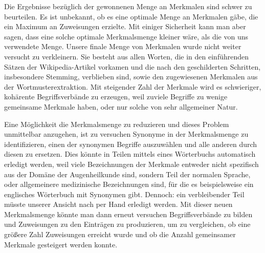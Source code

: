 \documentclass[pagesize,DIV=calc,12pt,final]{scrreprt}
\begin{document}
Die Ergebnisse bezüglich der gewonnenen Menge an Merkmalen sind schwer zu beurteilen.
Es ist unbekannt, ob es eine optimale Menge an Merkmalen gäbe, die ein Maximum an Zuweisungen erzielte.
Mit einiger Sicherheit kann man aber sagen, dass eine solche optimale Merkmalsmenge kleiner wäre, als die von uns verwendete Menge.
Unsere finale Menge von Merkmalen wurde nicht weiter versucht zu verkleinern.
Sie besteht aus allen Worten, die in den einführenden Sätzen der Wikipedia-Artikel vorkamen und die nach den geschilderten Schritten, insbesondere Stemming, verblieben sind, sowie den zugewiesenen Merkmalen aus der Wortmusterextraktion.
Mit steigender Zahl der Merkmale wird es schwieriger, kohärente Begriffsverbände zu erzeugen, weil zuviele Begriffe zu wenige gemeinsame Merkmale haben, oder nur solche von sehr allgemeiner Natur.

Eine Möglichkeit die Merkmalsmenge zu reduzieren und dieses Problem unmittelbar anzugehen, ist zu versuchen Synonyme in der Merkmalsmenge zu identifizieren, einen der synonymen Begriffe auszuwählen und alle anderen durch diesen zu ersetzen.
Dies könnte in Teilen mittels eines Wörterbuchs automatisch erledigt werden, weil viele Bezeichnungen der Merkmale entweder nicht spezifisch aus der Domäne der Augenheilkunde sind, sondern Teil der normalen Sprache, oder allgemeinere medizinische Bezeichnungen sind, für die es beispielsweise ein englisches Wörterbuch mit Synonymen gibt.
Dennoch: ein verbleibender Teil müsste unserer Ansicht nach per Hand erledigt werden.
Mit dieser neuen Merkmalsmenge könnte man dann erneut versuchen Begriffsverbände zu bilden und Zuweisungen zu den Einträgen zu produzieren, um zu vergleichen, ob eine größere Zahl Zuweisungen erreicht wurde und ob die Anzahl gemeinsamer Merkmale gesteigert werden konnte.
\end{document}
